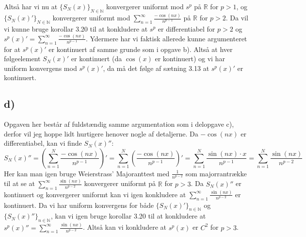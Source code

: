 \documentclass{article}
\newcommand{\m}[1]{\mathbb{#1}}
\newcommand{\mR}{\m{R}}
\newcommand{\mN}{\m{N}}
\newcommand{\lr}[1]{\left( #1\right)}
\begin{document}
Altså har vi nu at $\{ S_N(x) \}_{N \in \mN}$ konvergerer uniformt mod $s^p$ på $\mR$ for $p>1$, og
$\{ S_N(x)' \}_{N \in \mN}$ konvergerer uniformt mod $\sum_{n=1}^{\infty} \frac{-\cos(nx)}{n^{p-1}}$ på $\mR$ for $p>2$.
Da vil vi kunne bruge korollar 3.20 til at konkludere at $s^p$ er differentiabel for $p>2$ og
$s^{p}(x)' = \sum_{n=1}^{\infty} \frac{-\cos(nx)}{n^{p-1}}$. 
Ydermere har vi faktisk allerede kunne argumenteret for at $s^p(x)'$ er kontinuert af samme grunde som i
opgave b). Altså at hver følgeelement $S_N(x)'$ er kontinuert (da $\cos(x)$ er kontinuert) og vi har uniform konvergens mod
$s^p(x)'$, da må det følge af sætning 3.13\cite{an1} at $s^p(x)'$ er kontinuert.

\subsection*{d)}
Opgaven her består af fuldstændig samme argumentation som i delopgave c),
 derfor vil jeg hoppe lidt hurtigere henover nogle af detaljerne.
Da $-\cos(nx)$ er differentiabel, kan vi finde $S_N(x)''$:
\[
    S_N(x)'' = \lr{\sum_{n=1}^{N} \frac{-\cos(nx)}{n^{p-1}}}' 
    = \sum_{n=1}^{N} \lr{\frac{-\cos(nx)}{n^{p-1}}}'
    = \sum_{n=1}^{N} \frac{\sin(nx)\cdot x}{n^{p-1}}
    = \sum_{n=1}^{N} \frac{\sin(nx)}{n^{p-2}}
\]
Her kan man igen bruge Weierstrass' Majoranttest med $\frac{1}{n^{p-2}}$ som majorrantrække til at se at 
$\sum_{n=1}^{\infty} \frac{\sin(nx)}{n^{p-2}}$ konvergerer uniformt på $\mR$ for $p>3$.
Da $S_N(x)''$ er kontinuert og konvergerer uniformt kan vi igen konkludere at 
$\sum_{n=1}^{\infty} \frac{\sin(nx)}{n^{p-2}}$ er kontinuert.
Da vi har uniform konvergens for både $\{S_N(x)'\}_{n \in \mN}$ 
og $\{S_N(x)''\}_{n \in \mN}$, kan vi igen bruge korollar 3.20 til at konkludere
at $s^p(x)'' =  \sum_{n=1}^{\infty} \frac{\sin(nx)}{n^{p-2}}$.
Altså kan vi konkludere at $s^p(x)$ er $C^2$ for $p>3$.









\end{document}

